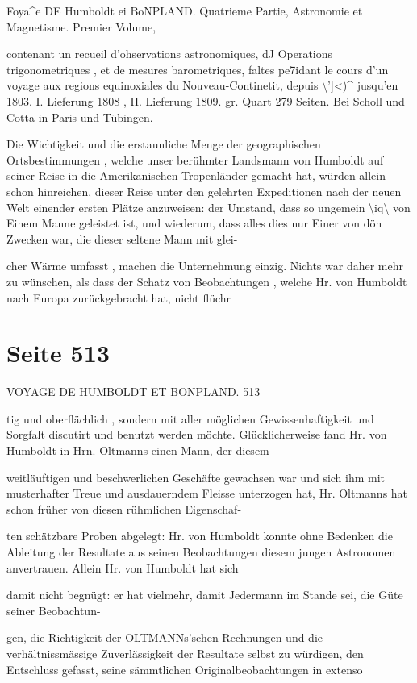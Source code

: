 \documentclass[10pt,a4paper]{article}
\begin{document}
Foya\textasciicircum{}e DE Humboldt ei BoNPLAND. Quatrieme Partie, Astronomie et Magnetisme. Premier Volume,

contenant un recueil d'ohservations astronomiques, dJ Operations trigonometriques , et de mesures barometriques, faltes pe7idant le cours d'un voyage aux regions equinoxiales du Nouveau-Continetit, depuis \textbackslash{}']<)\textasciicircum{} jusqu'en 1803. I. Lieferung 1808 , II. Lieferung 1809. gr. Quart 279 Seiten. Bei Scholl und Cotta in Paris und Tübingen.

Die Wichtigkeit und die erstaunliche Menge der geographischen Ortsbestimmungen , welche unser berühmter Landsmann von Humboldt auf seiner Reise in die Amerikanischen Tropenländer gemacht hat, würden allein schon hinreichen, dieser Reise unter den gelehrten Expeditionen nach der neuen Welt einender ersten Plätze anzuweisen: der Umstand, dass so ungemein \textbackslash{}iq\textbackslash{} von Einem Manne geleistet ist, und wiederum, dass alles dies nur Einer von dön Zwecken war, die dieser seltene Mann mit glei-

cher Wärme umfasst , machen die Unternehmung einzig. Nichts war daher mehr zu wünschen, als dass der Schatz von Beobachtungen , welche Hr. von Humboldt nach Europa zurückgebracht hat, nicht flüchr


\newpage
\section*{Seite 513}
VOYAGE DE HUMBOLDT ET BONPLAND. 513

tig und oberflächlich , sondern mit aller möglichen Gewissenhaftigkeit und Sorgfalt discutirt und benutzt werden möchte. Glücklicherweise fand Hr. von Humboldt in Hrn. Oltmanns einen Mann, der diesem

weitläuftigen und beschwerlichen Geschäfte gewachsen war und sich ihm mit musterhafter Treue und ausdauerndem Fleisse unterzogen hat, Hr. Oltmanns hat schon früher von diesen rühmlichen Eigenschaf-

ten schätzbare Proben abgelegt: Hr. von Humboldt konnte ohne Bedenken die Ableitung der Resultate aus seinen Beobachtungen diesem jungen Astronomen anvertrauen. Allein Hr. von Humboldt hat sich

damit nicht begnügt: er hat vielmehr, damit Jedermann im Stande sei, die Güte seiner Beobachtun-

gen, die Richtigkeit der OLTMANNs'schen Rechnungen und die verhältnissmässige Zuverlässigkeit der Resultate selbst zu würdigen, den Entschluss gefasst, seine sämmtlichen Originalbeobachtungen in extenso
\end{document}
